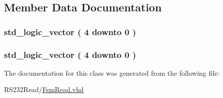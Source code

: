 \subsection{Member Data Documentation}
\hypertarget{class_f_s_m_read_1_1simple_a7a44fa5330ac293b382a610b0cf6937b}{}
\subsubsection[{Qn}]{ {\bfseries \textcolor{comment}{std\+\_\+logic\+\_\+vector}\textcolor{vhdlchar}{ }\textcolor{vhdlchar}{(}\textcolor{vhdlchar}{ }\textcolor{vhdlchar}{ } \textcolor{vhdldigit}{4} \textcolor{vhdlchar}{ }\textcolor{keywordflow}{downto}\textcolor{vhdlchar}{ }\textcolor{vhdlchar}{ } \textcolor{vhdldigit}{0} \textcolor{vhdlchar}{ }\textcolor{vhdlchar}{)}\textcolor{vhdlchar}{ }} \hspace{0.3cm}{\ttfamily [Signal]}}\label{class_f_s_m_read_1_1simple_a7a44fa5330ac293b382a610b0cf6937b}
\hypertarget{class_f_s_m_read_1_1simple_abf527e5ab705b833ba9cb4b73c5721c7}{}
\subsubsection[{Qp}]{ {\bfseries \textcolor{comment}{std\+\_\+logic\+\_\+vector}\textcolor{vhdlchar}{ }\textcolor{vhdlchar}{(}\textcolor{vhdlchar}{ }\textcolor{vhdlchar}{ } \textcolor{vhdldigit}{4} \textcolor{vhdlchar}{ }\textcolor{keywordflow}{downto}\textcolor{vhdlchar}{ }\textcolor{vhdlchar}{ } \textcolor{vhdldigit}{0} \textcolor{vhdlchar}{ }\textcolor{vhdlchar}{)}\textcolor{vhdlchar}{ }} \hspace{0.3cm}{\ttfamily [Signal]}}\label{class_f_s_m_read_1_1simple_abf527e5ab705b833ba9cb4b73c5721c7}


The documentation for this class was generated from the following file\+:\begin{DoxyCompactItemize}
\item 
R\+S232\+Read/\hyperlink{_fsm_read_8vhd}{Fsm\+Read.\+vhd}\end{DoxyCompactItemize}
